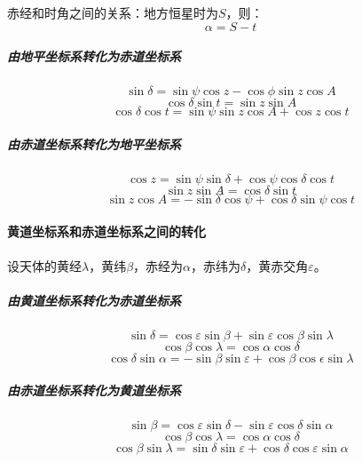 赤经和时角之间的关系：地方恒星时为$S$，则：
\begin{equation}
	\alpha = S-t
\end{equation}
\subparagraph{由地平坐标系转化为赤道坐标系}
\begin{equation}
	\sin \delta =\sin \psi \cos z-\cos \phi \sin z\cos A
\end{equation}
\begin{equation}
	\cos \delta\sin t =\sin z\sin A
\end{equation}
\begin{equation}
	\cos \delta \cos t=\sin\psi \sin z \cos A+\cos z\cos t
\end{equation}
\subparagraph{由赤道坐标系转化为地平坐标系}
\begin{equation}
	\cos z = \sin \psi \sin \delta +\cos \psi \cos \delta \cos t
\end{equation}
\begin{equation}
	 \sin z\sin A =\cos \delta\sin t
\end{equation}
\begin{equation}
	\sin z \cos A=-\sin \delta \cos \psi+\cos \delta \sin \psi \cos t
\end{equation}
\paragraph{黄道坐标系和赤道坐标系之间的转化}
设天体的黄经$\lambda$，黄纬$\beta$，赤经为$\alpha$，赤纬为$\delta$，黄赤交角$\varepsilon$。
\subparagraph{由黄道坐标系转化为赤道坐标系}
\begin{equation}
	\sin \delta =\cos \varepsilon\sin \beta +\sin \varepsilon\cos \beta \sin \lambda
\end{equation}
\begin{equation}
	\cos \beta \cos \lambda=\cos \alpha \cos \delta
\end{equation}
\begin{equation}
	\cos \delta\sin \alpha=-\sin\beta \sin \varepsilon+\cos \beta \cos \epsilon \sin \lambda
\end{equation}
\subparagraph{由赤道坐标系转化为黄道坐标系}
\begin{equation}
	\sin \beta =\cos \varepsilon \sin \delta -\sin \varepsilon\cos \delta \sin \alpha
\end{equation}
\begin{equation}
	\cos \beta \cos \lambda=\cos \alpha \cos \delta
\end{equation}
\begin{equation}
	\cos \beta \sin \lambda =\sin \delta \sin \varepsilon+\cos \delta \cos \varepsilon \sin \alpha
\end{equation}


